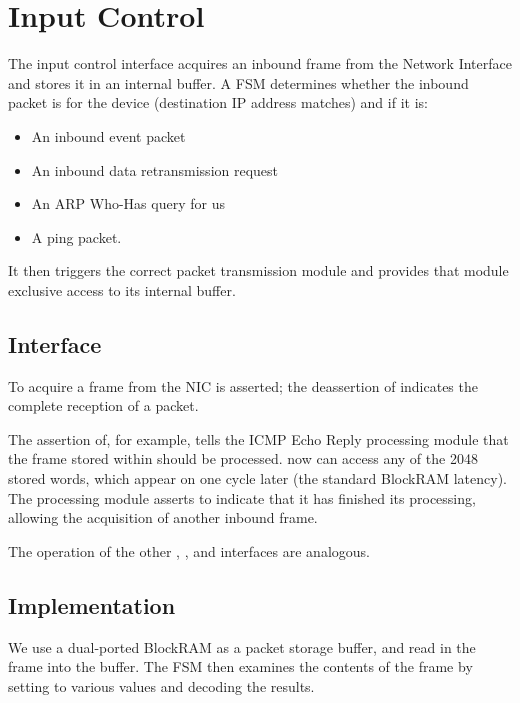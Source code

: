 \section{Input Control}

The input control interface acquires an inbound frame from the Network
Interface and stores it in an internal buffer. A FSM determines
whether the inbound packet is for the device (destination IP address
matches) and if it is: 

\begin{itemize}
\item An inbound event packet
\item An inbound data retransmission request
\item An ARP Who-Has query for us
\item A ping packet. 
\end{itemize}

It then triggers the correct packet transmission module and provides
that module exclusive access to its internal buffer.


\subsection{Interface}
To acquire a frame from the NIC  is asserted; the
deassertion of  indicates the complete reception of a
packet.

The assertion of, for example,  tells the ICMP Echo
Reply processing module that the frame stored within should be
processed.  now can access any of the 2048
stored words, which appear on  one cycle later
(the standard BlockRAM latency). The processing module asserts
 to indicate that it has finished its processing,
allowing the acquisition of another inbound frame.

The operation of the other , , and
 interfaces are analogous.

\subsection{Implementation} 

We use a dual-ported BlockRAM as a packet storage buffer, and read in
the frame into the buffer. The FSM then examines the contents of the
frame by setting  to various values and decoding the
results.

